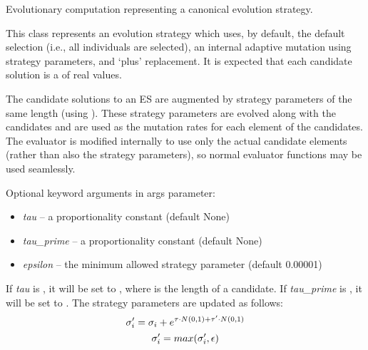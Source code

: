 \documentclass[letterpaper,10pt,english]{sphinxmanual}
\begin{document}
\begin{fulllineitems}
\label{reference:inspyred.ec.ES}
Evolutionary computation representing a canonical evolution strategy.

This class represents an evolution strategy which uses, by 
default, the default selection (i.e., all individuals are selected), 
an internal adaptive mutation using strategy parameters, and `plus' 
replacement. It is expected that each candidate solution is a 
of real values.

The candidate solutions to an ES are augmented by strategy parameters of
the same length (using ). These 
strategy parameters are evolved along with the candidates and are used as
the mutation rates for each element of the candidates. The evaluator is
modified internally to use only the actual candidate elements (rather than
also the strategy parameters), so normal evaluator functions may be used
seamlessly.

Optional keyword arguments in  args parameter:
\begin{itemize}
\item {} 
\emph{tau} -- a proportionality constant (default None)

\item {} 
\emph{tau\_prime} -- a proportionality constant (default None)

\item {} 
\emph{epsilon} -- the minimum allowed strategy parameter (default 0.00001)

\end{itemize}

If \emph{tau} is , it will be set to , where
 is the length of a candidate. If \emph{tau\_prime} is , it will be
set to . The strategy parameters are updated as follows:
\begin{gather}
\begin{split}\sigma_i^\prime = \sigma_i + e^{\tau \cdot N(0, 1) + \tau^\prime \cdot N(0, 1)}\end{split}\notag\\\begin{split}\sigma_i^\prime = max(\sigma_i^\prime, \epsilon)\end{split}\notag
\end{gather}
\end{fulllineitems}
\end{document}
